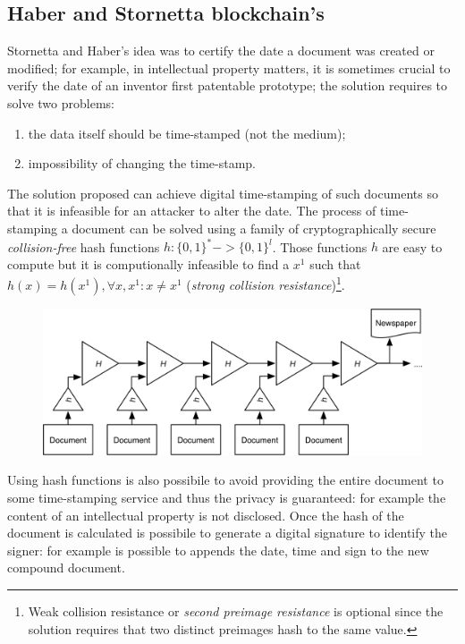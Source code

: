 \subsection{Haber and Stornetta blockchain's}

Stornetta and Haber's idea was to certify the date a document was created or modified; for example, in intellectual property matters, it is sometimes crucial to verify the date of an inventor first patentable prototype; the solution requires to solve two problems:

\begin{enumerate}
    \item the data itself should be time-stamped (not the medium);
    \item impossibility of changing the time-stamp.
\end{enumerate}

The solution proposed can achieve digital time-stamping of such documents so that it is infeasible for an attacker to alter the date.\newline
The process of time-stamping a document can be solved using a family of cryptographically secure \textit{collision-free} hash functions $h: \{0,1\}^* -> \{0,1\}^l$. Those functions $h$ are easy to compute but it is computionally infeasible to find a $x^1$ such that $h(x)=h(x^1), \forall x,x^1: x \neq x^1$ (\textit{strong collision resistance})\footnote{Weak collision resistance or \textit{second preimage resistance} is optional since the solution requires that two distinct preimages hash to the same value.}.\\

\begin{figure}
    \centering
    \includegraphics[scale=1.2]{images/haberstornetta.png}
\end{figure}

Using hash functions is also possibile to avoid providing the entire document to some time-stamping service and thus the privacy is guaranteed: for example the content of an intellectual property is not disclosed.\newline\newline
Once the hash of the document is calculated is possibile to generate a digital signature to identify the signer: for example is possible to appends the date, time and sign to the new compound document.

